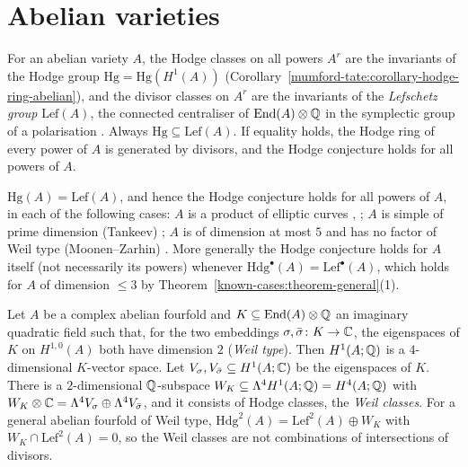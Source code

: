 \section{Abelian varieties}\label{known-cases:section-abelian}

\begin{remark}\label{known-cases:remark-abelian-mechanism}
For an abelian variety $A$, the Hodge classes on all powers $A^r$ are the invariants of the Hodge group $\mathrm{Hg} = \mathrm{Hg}(H^1(A))$ (Corollary~\ref{mumford-tate:corollary-hodge-ring-abelian}),
and the divisor classes on $A^r$ are the invariants of the \emph{Lefschetz group} $\mathrm{Lef}(A)$, the connected centraliser of $\operatorname{End}(A) \otimes \mathbb{Q}$ in the symplectic group of a polarisation
\cite{murty-1984}. Always $\mathrm{Hg} \subseteq \mathrm{Lef}(A)$. If equality holds, the Hodge ring of every power of $A$ is generated by divisors, and the Hodge conjecture holds for all powers of $A$.
\end{remark}

\begin{theorem}\label{known-cases:theorem-abelian-known}
$\mathrm{Hg}(A) = \mathrm{Lef}(A)$, and hence the Hodge conjecture holds for all powers of $A$, in each of the following cases: $A$ is a product of elliptic curves \cite{imai-1976},
\cite{murty-1984}; $A$ is simple of prime dimension (Tankeev) \cite{tankeev-1982}; $A$ is of dimension at most $5$ and has no factor of Weil type (Moonen--Zarhin) \cite{moonen-zarhin-1999}. More
generally the Hodge conjecture holds for $A$ itself (not necessarily its powers) whenever $\mathrm{Hdg}^\bullet(A) = \mathrm{Lef}^\bullet(A)$, which holds for $A$ of dimension $\leq 3$ by
Theorem~\ref{known-cases:theorem-general}(1).
\end{theorem}

\begin{proposition}\label{known-cases:proposition-weil-classes}
Let $A$ be a complex abelian fourfold and $K \subseteq \operatorname{End}(A) \otimes \mathbb{Q}$ an imaginary quadratic field such that, for the two embeddings $\sigma, \bar\sigma \colon K \to \mathbb{C}$, the eigenspaces of $K$
on $H^{1,0}(A)$ both have dimension $2$ (\emph{Weil type}). Then $H^1(A; \mathbb{Q})$ is a $4$-dimensional $K$-vector space. Let $V_\sigma, V_{\bar\sigma} \subseteq H^1(A; \mathbb{C})$ be the eigenspaces of $K$.
There is a $2$-dimensional $\mathbb{Q}$-subspace $W_K \subseteq \Lambda^4H^1(A; \mathbb{Q}) = H^4(A; \mathbb{Q})$ with $W_K \otimes \mathbb{C} = \Lambda^4V_\sigma \oplus \Lambda^4V_{\bar\sigma}$, and it consists of Hodge classes, the
\emph{Weil classes}. For a general abelian fourfold of Weil type, $\mathrm{Hdg}^2(A) = \mathrm{Lef}^2(A) \oplus W_K$ with $W_K \cap \mathrm{Lef}^2(A) = 0$, so the Weil classes are
not combinations of intersections of divisors.
\end{proposition}

